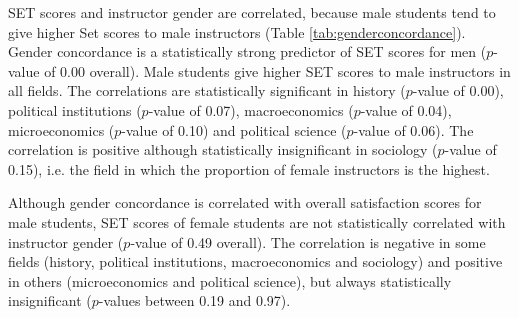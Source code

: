 \documentclass[12pt]{article}
\begin{document}
SET scores and instructor gender are correlated, because male students tend to give higher Set scores to male instructors (Table \ref{tab:genderconcordance}). Gender concordance is a statistically strong predictor of SET scores for men ($p$-value of 0.00 overall). Male students give higher SET scores to male instructors in all fields. The correlations are statistically significant in history ($p$-value of 0.00), political institutions ($p$-value of 0.07), macroeconomics ($p$-value of 0.04), microeconomics ($p$-value of 0.10) and political science ($p$-value of 0.06). The correlation is positive although statistically insignificant in sociology ($p$-value of 0.15), i.e. the field in which the proportion of female instructors is the highest. 

Although gender concordance is correlated with overall satisfaction scores for male students, SET scores of female students are not statistically correlated with instructor gender ($p$-value of 0.49 overall). The correlation is negative in some fields (history, political institutions, macroeconomics and sociology) and positive in others (microeconomics and political science), but always statistically insignificant ($p$-values between 0.19 and 0.97).
\end{document}
